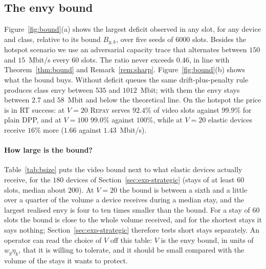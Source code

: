 \documentclass[preprint,11pt]{elsarticle}
\theoremstyle{definition}
\theoremstyle{remark}
\newcommand{\rmax}{r^{\max}}
\newcommand{\repay}{\textsc{Repay}}
\begin{document}
\subsection{The envy bound}\label{sec:exp-bound}

Figure~\ref{fig:bound}(a) shows the largest deficit observed in any slot, for any device and class, relative to its bound $B_{g,k}$, over five seeds of $6000$ slots.
Besides the hotspot scenario we use an adversarial capacity trace that alternates between $150$ and $15$~Mbit/s every $60$ slots.
The ratio never exceeds $0.46$, in line with Theorem~\ref{thm:bound} and Remark~\ref{rem:sharp}.
Figure~\ref{fig:bound}(b) shows what the bound buys.
Without deficit queues the same drift-plus-penalty rule produces class envy between $535$ and $1012$~Mbit; with them the envy stays between $2.7$ and $58$~Mbit and below the theoretical line.
On the hotspot the price is in RT success: at $V=20$ \repay{} serves $92.4\%$ of video slots against $99.9\%$ for plain DPP, and at $V=100$ $99.0\%$ against $100\%$, while at $V=20$ elastic devices receive $16\%$ more ($1.66$ against $1.43$~Mbit/s).

\paragraph{How large is the bound?}
Table~\ref{tab:bsize} puts the video bound next to what elastic devices actually receive, for the $180$ devices of Section~\ref{sec:exp-strategic} (stays of at least $60$ slots, median about $200$).
At $V=20$ the bound is between a sixth and a little over a quarter of the volume a device receives during a median stay, and the largest realised envy is four to ten times smaller than the bound.
For a stay of $60$ slots the bound is close to the whole volume received, and for the shortest stays it says nothing; Section~\ref{sec:exp-strategic} therefore tests short stays separately.
An operator can read the choice of $V$ off this table: $V$ is the envy bound, in units of $w_g\eta_k$, that it is willing to tolerate, and it should be small compared with the volume of the stays it wants to protect.

\begin{table}[t]
\centering
\caption{The video bound $B_{g,\mathrm{v}}=Vw_g\eta_{\mathrm{v}}+\rmax_{\mathrm{v}}$ at $V=20$ against realised quantities under \repay{} ($180$ elastic devices on six traces, truthful declarations). The gaming bounds are $100.2$, $200.2$ and $150.2$~Mbit.}
\label{tab:bsize}
\end{table}
\end{document}

